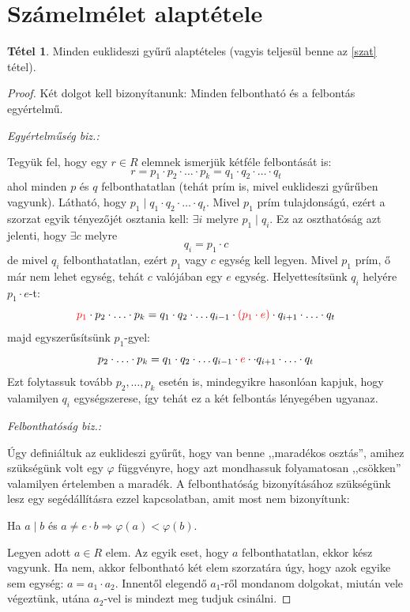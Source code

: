 \documentclass[12pt]{book}
\theoremstyle{plain} %
\theoremstyle{definition} %
\newtheorem{theo/}{Tétel}[section]
\newenvironment{theo}
  {\renewcommand{\qedsymbol}{$\clubsuit$}%
   \pushQED{\qed}\begin{theo/}}
  {\popQED\end{theo/}}
\theoremstyle{remark}
\renewcommand\qedsymbol{$\blacksquare$}
\numberwithin{equation}{section}  %
\begin{document}
	\section{Számelmélet alaptétele}
	\begin{theo}\label{szatbiz}
		Minden euklideszi gyűrű alaptételes (vagyis teljesül benne az \ref{szat} tétel).
	\end{theo}
	\begin{proof}
		Két dolgot kell bizonyítanunk: Minden felbontható és a felbontás egyértelmű.
		
		\textit{Egyértelműség biz.:}
		
		Tegyük fel, hogy egy $r\in R$ elemnek ismerjük kétféle felbontását is:
		\[ r = p_1\cdot p_2\cdot \ldots \cdot p_k = q_1 \cdot q_2 \cdot \ldots \cdot q_t  \]
		ahol minden $p$ és $q$ felbonthatatlan (tehát prím is, mivel euklideszi gyűrűben vagyunk).
		Látható, hogy $p_1\mid q_1 \cdot q_2 \cdot \ldots \cdot q_t$. Mivel $p_1$ prím tulajdonságú, ezért a szorzat egyik tényezőjét osztania kell: $\exists i$ melyre $p_1\mid q_i$. Ez az oszthatóság azt jelenti, hogy $\exists c$ melyre
		\[ q_i = p_1 \cdot c  \]
		de mivel $q_i$ felbonthatatlan, ezért $p_1$ vagy $c$ egység kell legyen. Mivel $p_1$ prím, ő már nem lehet egység, tehát $c$ valójában egy $e$ egység. Helyettesítsünk $q_i$ helyére $p_1\cdot e$-t:
		\[ \color{red} p_1 \color{black} \cdot p_2\cdot \ldots \cdot p_k = q_1 \cdot q_2 \cdot \ldots q_{i-1} \cdot \color{red} (p_1\cdot e) \color{black} \cdot q_{i+1} \cdot \ldots \cdot q_t  \]
		majd egyszerűsítsünk $p_1$-gyel:
		\[ p_2\cdot \ldots \cdot p_k = q_1 \cdot q_2 \cdot \ldots q_{i-1} \cdot \color{red} e \color{black} \cdot \cdot q_{i+1} \cdot \ldots \cdot q_t  \]
		Ezt folytassuk tovább $p_2,\ldots,p_k$ esetén is, mindegyikre hasonlóan kapjuk, hogy valamilyen $q_i$ egységszerese, így tehát ez a két felbontás lényegében ugyanaz.
		
		\textit{Felbonthatóság biz.:}
		
		Úgy definiáltuk az euklideszi gyűrűt, hogy van benne ,,maradékos osztás'', amihez szükségünk volt egy $\varphi$ függvényre, hogy azt mondhassuk folyamatosan ,,csökken'' valamilyen értelemben a maradék. A felbonthatóság bizonyításához szükségünk lesz egy segédállításra ezzel kapcsolatban, amit most nem bizonyítunk: 
		\begin{center}
			Ha $a\mid b$ és $a\neq e\cdot b \Rightarrow \varphi(a)<\varphi(b)$.
		\end{center}
		Legyen adott $a\in R$ elem. Az egyik eset, hogy $a$ felbonthatatlan, ekkor kész vagyunk.
		Ha nem, akkor felbontható két elem szorzatára úgy, hogy azok egyike sem egység: $a = a_1 \cdot a_2$. Innentől elegendő $a_1$-ről mondanom dolgokat, miután vele végeztünk, utána $a_2$-vel is mindezt meg tudjuk csinálni.
		

\end{proof}
\end{document}
